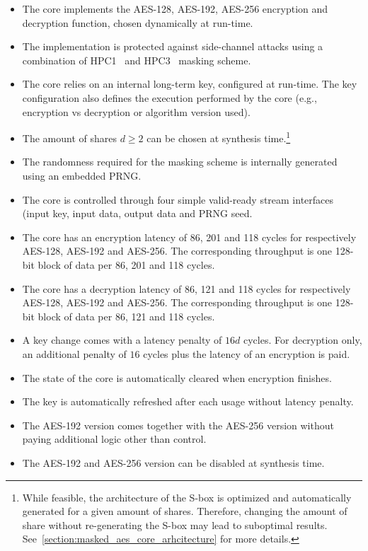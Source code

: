 \documentclass{scrartcl}
\begin{document}
\begin{itemize}
\item{The core implements the AES-128, AES-192, AES-256 encryption and decryption function, chosen dynamically at run-time.}
\item{The implementation is protected against side-channel attacks using a combination of HPC1~\cite{DBLP:journals/tc/CassiersGLS21} and HPC3~\cite{DBLP:conf/ccs/Knichel022} masking scheme.}
\item{The core relies on an internal long-term key, configured at run-time. The key configuration also defines the execution performed by the core (e.g., encryption vs decryption or algorithm version used).}
\item{The amount of shares $d\ge 2$ can be chosen at synthesis time.\footnote{While feasible, the architecture of the S-box is optimized and automatically generated for a given amount of shares. Therefore, changing the amount of share without re-generating the S-box may lead to suboptimal results. See~\ref{section:masked_aes_core_arhcitecture} for more details.}}
\item{The randomness required for the masking scheme is internally generated using an embedded PRNG.}
\item{The core is controlled through four simple valid-ready stream interfaces (input key, input data, output data and PRNG seed.}
\item{The core has an encryption latency of 86, 201 and 118 cycles for respectively AES-128, AES-192 and AES-256. The corresponding throughput is one 128-bit block of data per 86, 201 and 118 cycles.}
\item{The core has a decryption latency of 86, 121 and 118 cycles for respectively AES-128, AES-192 and AES-256. The corresponding throughput is one 128-bit block of data per 86, 121 and 118 cycles.}
\item{A key change comes with a latency penalty of $16d$ cycles. For decryption only, an additional penalty of $16$ cycles plus the latency of an encryption is paid.}
\item{The state of the core is automatically cleared when encryption finishes.}
\item{The key is automatically refreshed after each usage without latency penalty.}
\item{The AES-192 version comes together with the AES-256 version without paying additional logic other than control.}
\item{The AES-192 and AES-256 version can be disabled at synthesis time. }
\end{itemize}
\end{document}
